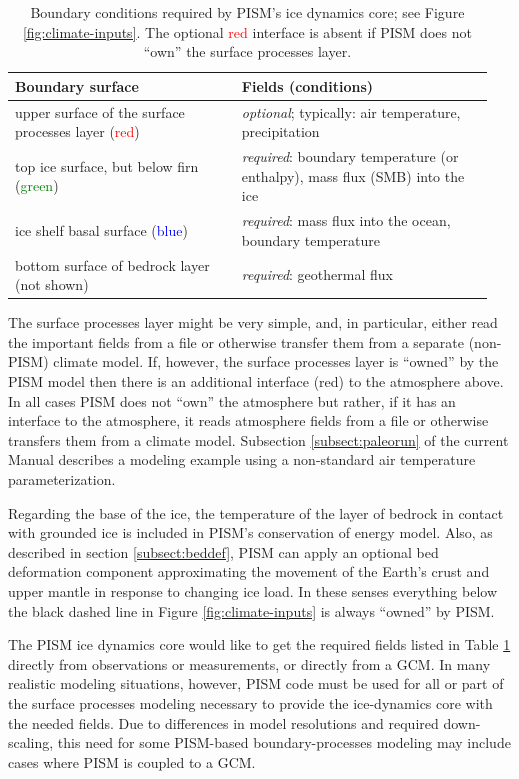 \begin{table}[ht]
  \centering
 \begin{tabular}{p{0.45\linewidth}p{0.5\linewidth}}
    \toprule
    \textbf{Boundary surface} & \textbf{Fields (conditions)} \\
    \midrule
    upper surface of the surface processes layer (\textcolor{red}{red}) & \emph{optional}; typically: air temperature, precipitation \\
    top ice surface, but below firn (\textcolor{green}{green}) & \emph{required}: boundary temperature (or enthalpy), mass flux (SMB) into the ice\\
    ice shelf basal surface (\textcolor{blue}{blue}) & \emph{required}: mass flux into the ocean, boundary temperature\\
    bottom surface of bedrock layer (not shown) & \emph{required}: geothermal flux\\
   \bottomrule
  \end{tabular}
\caption{Boundary conditions required by PISM's ice dynamics core; see Figure \ref{fig:climate-inputs}.  The optional \textcolor{red}{red} interface is absent if PISM does not ``own'' the surface processes layer.}
\label{tab:ice-dynamics-bc}
\end{table}

The surface processes layer might be very simple, and, in particular, either read the important fields from a file or otherwise transfer them from a separate (non-PISM) climate model.  If, however, the surface processes layer is ``owned'' by the PISM model then there is an additional interface (red) to the atmosphere above.  In all cases PISM does not ``own'' the atmosphere but rather, if it has an interface to the atmosphere, it reads atmosphere fields from a file or otherwise transfers them from a climate model.  Subsection \ref{subsect:paleorun} of the current Manual describes a modeling example using a non-standard air temperature parameterization.

Regarding the base of the ice, the temperature of the layer of bedrock in contact with grounded ice is included in PISM's conservation of energy model.  Also, as described in section \ref{subsect:beddef}, PISM can apply an optional bed deformation component approximating the movement of the Earth's crust and upper mantle in response to changing ice load.  In these senses everything below the black dashed line in Figure \ref{fig:climate-inputs} is always ``owned'' by PISM.

The PISM ice dynamics core would like to get the required fields listed in Table
\ref{tab:ice-dynamics-bc} directly from observations or measurements, or directly from a GCM.  In many realistic modeling situations, however, PISM code must be used for all or part of the surface processes modeling necessary to provide the ice-dynamics core with the needed fields.  Due to differences in model resolutions and required down-scaling, this need for some PISM-based boundary-processes modeling may include cases where PISM is coupled to a GCM.  

